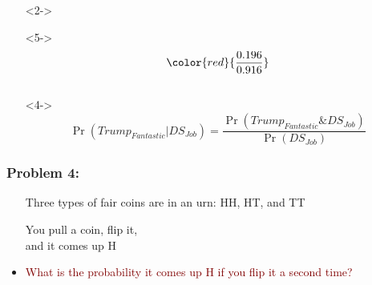 \documentclass[xcolor={dvipsnames}]{beamer}
\begin{document}
{\begin{columns}
\begin{column}{.45\textwidth}
\begin{itemize}
\item[]<2->
\vspace{-2em}
\tiny
{}
\item[]<5->
\large
\vspace{-1em}
$$\color{red}{\frac{0.196}{0.916}}$$

\end{itemize}
\end{column}
\end{columns}

\begin{itemize}
\item[]<4->
$$\Pr( Trump_{Fantastic} | DS_{Job} ) = \frac{\Pr( Trump_{Fantastic} \& DS_{Job}) }{\Pr(DS_{Job})}$$
\end{itemize}


}


\frame
{
 \frametitle{Problem 4:}

\LARGE 
\begin{itemize}
\item[] Three types of fair coins are in an urn: HH, HT, and TT \Huge
\item[] \textcolor{NavyBlue}{You pull a coin, flip it,\\ and it comes up H}
\item[] \huge
\item \textcolor{Maroon}{What is the probability it comes up H if you flip it a second time?}
\end{itemize}

}
\end{document}
